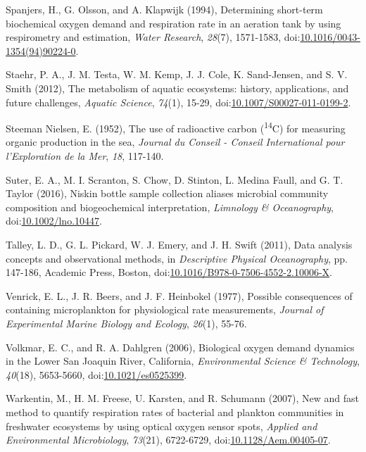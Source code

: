\begin{singlespace}
{{Spanjers, H., G. Olsson, and A. Klapwijk (1994), Determining short-term biochemical oxygen demand and respiration rate in an aeration tank by using respirometry and estimation, \emph{Water Research}, \emph{28}(7), 1571-1583, doi:\href{http://dx.doi.org/10.1016/0043-1354(94)90224-0}{10.1016/0043-1354(94)90224-0}.

Staehr, P. A., J. M. Testa, W. M. Kemp, J. J. Cole, K. Sand-Jensen, and S. V. Smith (2012), The metabolism of aquatic ecosystems: history, applications, and future challenges, \emph{Aquatic Science}, \emph{74}(1), 15-29, doi:\href{http://dx.doi.org/10.1007/S00027-011-0199-2}{10.1007/S00027-011-0199-2}.

Steeman Nielsen, E. (1952), The use of radioactive carbon (\textsuperscript{14}C) for measuring organic production in the sea, \emph{Journal du Conseil - Conseil International pour l'Exploration de la Mer}, \emph{18}, 117-140.

Suter, E. A., M. I. Scranton, S. Chow, D. Stinton, L. Medina Faull, and G. T. Taylor (2016), Niskin bottle sample collection aliases microbial community composition and biogeochemical interpretation, \emph{Limnology \& Oceanography}, doi:\href{http://dx.doi.org/10.1002/lno.10447}{10.1002/lno.10447}.

Talley, L. D., G. L. Pickard, W. J. Emery, and J. H. Swift (2011), Data analysis concepts and observational methods, in \emph{Descriptive Physical Oceanography}, pp. 147-186, Academic Press, Boston, doi:\href{http://dx.doi.org/10.1016/B978-0-7506-4552-2.10006-X}{10.1016/B978-0-7506-4552-2.10006-X}.

Venrick, E. L., J. R. Beers, and J. F. Heinbokel (1977), Possible consequences of containing microplankton for physiological rate measurements, \emph{Journal of Experimental Marine Biology and Ecology}, \emph{26}(1), 55-76.

Volkmar, E. C., and R. A. Dahlgren (2006), Biological oxygen demand dynamics in the Lower San Joaquin River, California, \emph{Environmental Science \& Technology}, \emph{40}(18), 5653-5660, doi:\href{http://dx.doi.org/10.1021/es0525399}{10.1021/es0525399}.

Warkentin, M., H. M. Freese, U. Karsten, and R. Schumann (2007), New and fast method to quantify respiration rates of bacterial and plankton communities in freshwater ecosystems by using optical oxygen sensor spots, \emph{Applied and Environmental Microbiology}, \emph{73}(21), 6722-6729, doi:\href{http://dx.doi.org/10.1128/Aem.00405-07}{10.1128/Aem.00405-07}.

}}
\end{singlespace}
